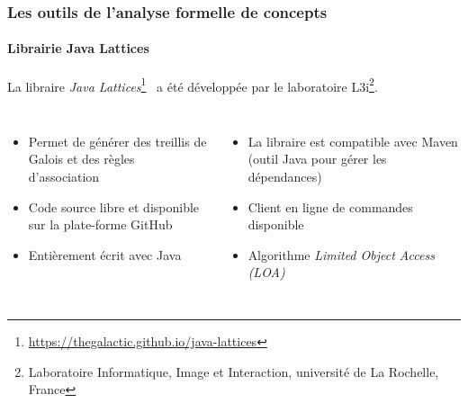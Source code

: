 \documentclass[french]{beamer}
\begin{document}
\begin{frame}
\frametitle{Les outils de l'analyse formelle de concepts}
\framesubtitle{Librairie Java Lattices}
La libraire \textit{Java Lattices}\footnote{\url{https://thegalactic.github.io/java-lattices}}~\parencite{Bertet2014} a été développée par le laboratoire L3i\footnote{Laboratoire Informatique, Image et Interaction, université de La Rochelle, France}.
\begin{columns}[t]
\begin{itemize}
\item Permet de générer des treillis de Galois et des règles d'association
\item Code source libre et disponible sur la plate-forme GitHub
\item Entièrement écrit avec Java
\end{itemize}
\begin{itemize}
\item La libraire est compatible avec Maven (outil Java pour gérer les dépendances)
\item Client en ligne de commandes disponible
\item Algorithme \emph{Limited Object Access (LOA)}~\parencite{Demko2011}
\end{itemize}
\end{columns}
\end{frame}
\end{document}
